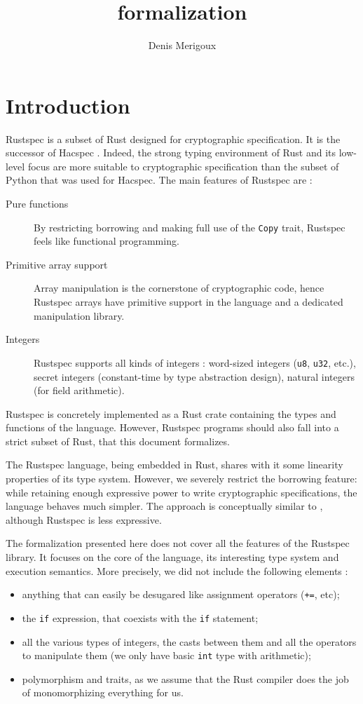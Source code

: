 \documentclass[11pt,a4paper]{article}
\title{\rustspec{} formalization}
\author{Denis Merigoux}
\newcommand{\rustspec}{\textsf{Rustspec}}
\newcommand{\syntext}[1]{\texttt{#1}}
\newcommand{\synkeyword}[1]{\textcolor{red!60!black}{\syntext{#1}}}
\newcommand{\synpunct}[1]{\textcolor{black!40!white}{\texttt{#1}}}
\newcommand{\synint}{\synkeyword{int}}
\newcommand{\synif}{\synkeyword{if}\;}
\begin{document}
\maketitle

\section{Introduction}

\rustspec{} is a subset of Rust designed for cryptographic specification. It is the successor of
Hacspec \cite{karthik2018hacspec}. Indeed, the strong typing environment of Rust and its low-level
focus are more suitable to cryptographic specification than the subset of Python that was used for
Hacspec. The main features of \rustspec{} are :
\begin{description}
  \item[Pure functions] By restricting borrowing and making full use of the \syntext{Copy} trait, \rustspec{} feels like functional programming.
  \item[Primitive array support] Array manipulation is the cornerstone of cryptographic code, hence
  \rustspec{} arrays have primitive support in the language and a dedicated manipulation library.
  \item[Integers] \rustspec{} supports all kinds of integers : word-sized integers (\synkeyword{u8}, \synkeyword{u32}, etc.), secret integers (constant-time by type abstraction design),
  natural integers (for field arithmetic).
\end{description}

\rustspec{} is concretely implemented as a Rust crate containing the types and functions of the
language. However, \rustspec{} programs should also fall into a strict subset of Rust, that this
document formalizes.

The \rustspec{} language, being embedded in Rust, shares with it some linearity properties of its
type system. However, we severely restrict the borrowing feature: while retaining enough expressive
power to write cryptographic specifications, the language behaves much simpler. The approach is conceptually similar to \cite{radanne2019kindly}, although \rustspec{} is less expressive.

The formalization presented here does not cover all the features of the \rustspec{} library. It
focuses on the core of the language, its interesting type system and execution semantics. More
precisely, we did not include the following elements :
\begin{itemize}
  \item anything that can easily be desugared like assignment operators (\synpunct{+=}, etc);
  \item the \synif{} expression, that coexists with the \synif{} statement;
  \item all the various types of integers, the casts between them and all the operators to
  manipulate them (we only have basic \synint{} type with arithmetic);
  \item polymorphism and traits, as we assume that the Rust compiler does the job of monomorphizing
  everything for us.
\end{itemize}
\end{document}

